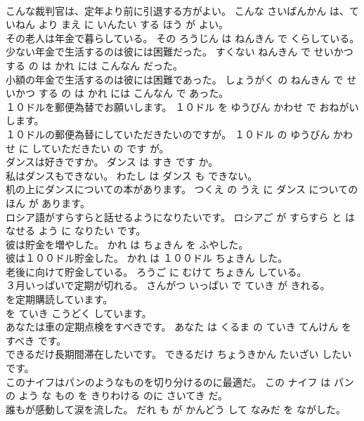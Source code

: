 \documentclass[8pt]{extreport}
\begin{document}
\begin{CJK}{UTF8}{min}
\\	こんな裁判官は、定年より前に引退する方がよい。	こんな さいばんかん は、ていねん より まえ に いんたい する ほう が よい。	
\\	その老人は年金で暮らしている。	その ろうじん は ねんきん で くらしている。	
\\	少ない年金で生活するのは彼には困難だった。	すくない ねんきん で せいかつ する の は かれ には こんなん だった。	
\\	小額の年金で生活するのは彼には困難であった。	しょうがく の ねんきん で せいかつ する の は かれ には こんなん で あった。	
\\	１０ドルを郵便為替でお願いします。	１０ドル を ゆうびん かわせ で おねがい します。	
\\	１０ドルの郵便為替にしていただきたいのですが。	１０ドル の ゆうびん かわせ に していただきたい の です が。	
\\	ダンスは好きですか。	ダンス は すき です か。	
\\	私はダンスもできない。	わたし は ダンス も できない。	
\\	机の上にダンスについての本があります。	つくえ の うえ に ダンス についての ほん が あります。	
\\	ロシア語がすらすらと話せるようになりたいです。	ロシアご が すらすら と はなせる よう に なりたい です。	
\\	彼は貯金を増やした。	かれ は ちょきん を ふやした。	
\\	彼は１００ドル貯金した。	かれ は １００ドル ちょきん した。	
\\	老後に向けて貯金している。	ろうご に むけて ちょきん している。	
\\	３月いっぱいで定期が切れる。	さんがつ いっぱい で ていき が きれる。	
\\	を定期購読しています。	
\\	を ていき こうどく しています。	
\\	あなたは車の定期点検をすべきです。	あなた は くるま の ていき てんけん を すべき です。	
\\	できるだけ長期間滞在したいです。	できるだけ ちょうきかん たいざい したいです。	
\\	このナイフはパンのようなものを切り分けるのに最適だ。	この ナイフ は パン の よう な もの を きりわける のに さいてき だ。	
\\	誰もが感動して涙を流した。	だれ も が かんどう して なみだ を ながした。	
\end{CJK}
\end{document}
